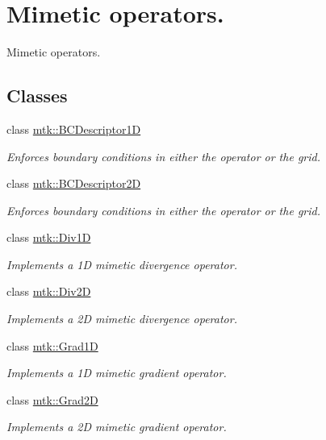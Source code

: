 \hypertarget{group__c07-mim__ops}{\section{Mimetic operators.}
\label{group__c07-mim__ops}
}


Mimetic operators.  


\subsection*{Classes}
\begin{DoxyCompactItemize}
\item 
class \hyperlink{classmtk_1_1BCDescriptor1D}{mtk\+::\+B\+C\+Descriptor1\+D}
\begin{DoxyCompactList}\small\item\em Enforces boundary conditions in either the operator or the grid. \end{DoxyCompactList}\item 
class \hyperlink{classmtk_1_1BCDescriptor2D}{mtk\+::\+B\+C\+Descriptor2\+D}
\begin{DoxyCompactList}\small\item\em Enforces boundary conditions in either the operator or the grid. \end{DoxyCompactList}\item 
class \hyperlink{classmtk_1_1Div1D}{mtk\+::\+Div1\+D}
\begin{DoxyCompactList}\small\item\em Implements a 1\+D mimetic divergence operator. \end{DoxyCompactList}\item 
class \hyperlink{classmtk_1_1Div2D}{mtk\+::\+Div2\+D}
\begin{DoxyCompactList}\small\item\em Implements a 2\+D mimetic divergence operator. \end{DoxyCompactList}\item 
class \hyperlink{classmtk_1_1Grad1D}{mtk\+::\+Grad1\+D}
\begin{DoxyCompactList}\small\item\em Implements a 1\+D mimetic gradient operator. \end{DoxyCompactList}\item 
class \hyperlink{classmtk_1_1Grad2D}{mtk\+::\+Grad2\+D}
\begin{DoxyCompactList}\small\item\em Implements a 2\+D mimetic gradient operator. \end{DoxyCompactList}\item 

\end{DoxyCompactItemize}
